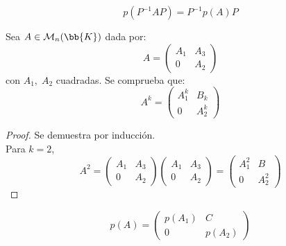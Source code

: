 \begin{coro}
    $$p(P^{-1}AP) = P^{-1}p(A)P$$
\end{coro}

\begin{lema}
    Sea $A\in\mathcal{M}_n(\bb{K})$ dada por:
    \begin{equation*}
        A = \left( \begin{array}{c|c}
            A_1 & A_3 \\ \hline
            0 & A_2
        \end{array} \right)
    \end{equation*}
    con $A_1,\;A_2$ cuadradas. Se comprueba que:
    \begin{equation*}
        A^k = \left( \begin{array}{c|c}
            A_1^k & B_k \\ \hline
            0 & A_2^k
        \end{array} \right)
    \end{equation*}
\end{lema}
\begin{proof}
    Se demuestra por inducción.\\
    Para $k=2$,
    \begin{equation*}
        A^2 = \left( \begin{array}{c|c}
            A_1 & A_3 \\ \hline
            0 & A_2
        \end{array} \right)
        \left( \begin{array}{c|c}
            A_1 & A_3 \\ \hline
            0 & A_2
        \end{array} \right) = 
        \left( \begin{array}{c|c}
            A_1^2 & B \\ \hline
            0 & A_2^2
        \end{array} \right)
    \end{equation*}
\end{proof}

\begin{coro}
    \begin{equation*}
        p(A) = \left( \begin{array}{c|c}
            p(A_1) & C \\ \hline
            0 & p(A_2)
        \end{array} \right)
    \end{equation*}
\end{coro}

